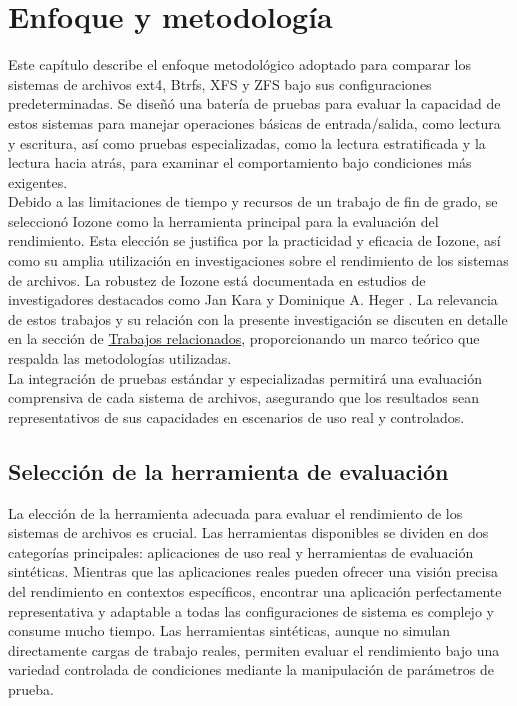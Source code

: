 \chapter{Enfoque y metodología}\label{sec:capítulo_4}

Este capítulo describe el enfoque metodológico adoptado para comparar los sistemas de archivos ext4, Btrfs, XFS y ZFS bajo sus configuraciones predeterminadas. Se diseñó una batería de pruebas para evaluar la capacidad de estos sistemas para manejar operaciones básicas de entrada/salida, como lectura y escritura, así como pruebas especializadas, como la lectura estratificada y la lectura hacia atrás, para examinar el comportamiento bajo condiciones más exigentes.\\

Debido a las limitaciones de tiempo y recursos de un trabajo de fin de grado, se seleccionó Iozone como la herramienta principal para la evaluación del rendimiento. Esta elección se justifica por la practicidad y eficacia de Iozone, así como su amplia utilización en investigaciones sobre el rendimiento de los sistemas de archivos. La robustez de Iozone está documentada en estudios de investigadores destacados como Jan Kara \cite{kara2010btrfs} y Dominique A. Heger \cite{heger2012fs}. La relevancia de estos trabajos y su relación con la presente investigación se discuten en detalle en la sección de \hyperref[sec:trabajos relacionados]{Trabajos relacionados}, proporcionando un marco teórico que respalda las metodologías utilizadas.\\

La integración de pruebas estándar y especializadas permitirá una evaluación comprensiva de cada sistema de archivos, asegurando que los resultados sean representativos de sus capacidades en escenarios de uso real y controlados.

\section{Selección de la herramienta de evaluación}

La elección de la herramienta adecuada para evaluar el rendimiento de los sistemas de archivos es crucial. Las herramientas disponibles se dividen en dos categorías principales: aplicaciones de uso real y herramientas de evaluación sintéticas. Mientras que las aplicaciones reales pueden ofrecer una visión precisa del rendimiento en contextos específicos, encontrar una aplicación perfectamente representativa y adaptable a todas las configuraciones de sistema es complejo y consume mucho tiempo. Las herramientas sintéticas, aunque no simulan directamente cargas de trabajo reales, permiten evaluar el rendimiento bajo una variedad controlada de condiciones mediante la manipulación de parámetros de prueba.\\

